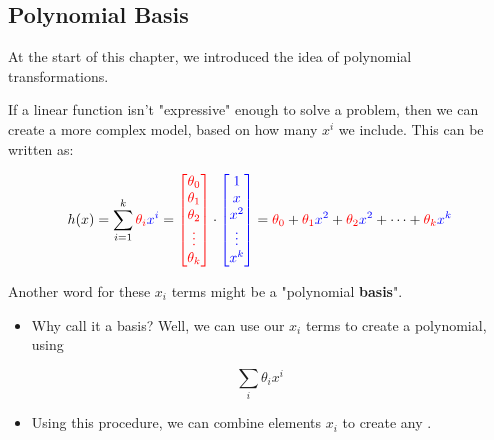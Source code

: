         \subsection{Polynomial Basis}

            At the start of this chapter, we introduced the idea of polynomial transformations.
            
            If a linear function isn't "expressive" enough to solve a problem, then we can create a more complex model, based on how many $x^i$ we include. This can be written as:

            \begin{equation}
                h(x) =
                \sum_{i=1}^{k}
                \textcolor{red}{\theta_i} \textcolor{blue}{x^i}
                =
                \textcolor{red}{
                \begin{bmatrix}
                 \theta_0 \\ \theta_1 \\ \theta_2 \\ \vdots \\ \theta_k
                \end{bmatrix}
                }
                \cdot
                \textcolor{blue}{
                \begin{bmatrix}
                    1 \\ x \\ x^2 \\ \vdots \\ x^k
                \end{bmatrix}
                }
                =
                \textcolor{red}{\theta_0} + \textcolor{red}{\theta_1}\textcolor{blue}{x^2} + \textcolor{red}{\theta_2}\textcolor{blue}{x^2} + \cdots + \textcolor{red}{\theta_k}\textcolor{blue}{x^k}
            \end{equation}

            Another word for these $x_i$ terms might be a "polynomial \textbf{basis}".

            \begin{itemize}
                \item Why call it a basis? Well, we can use our $x_i$ terms to create a polynomial, using
            \end{itemize}

            \begin{equation}
                \sum_i \theta_i x^i
            \end{equation}

            \begin{itemize}
                \item Using this procedure, we can combine  elements $x_i$ to create any .
            \end{itemize}

